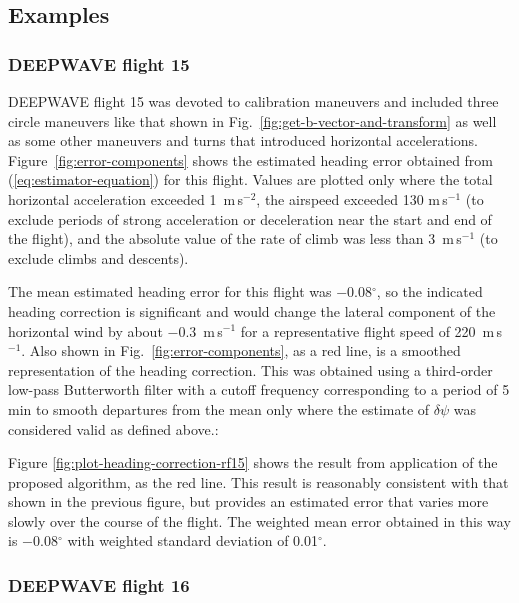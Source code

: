 \documentclass[english,british,amtd,bookmarks=false,unicode=true]{copernicus}\usepackage[]{graphicx}\usepackage[]{color}
\begin{document}
\subsection{Examples\label{sub:Examples-roll}}


\subsubsection{DEEPWAVE flight 15}

DEEPWAVE flight 15 was devoted to calibration maneuvers and included
three circle maneuvers like that shown in Fig.~\ref{fig:get-b-vector-and-transform}
as well as some other maneuvers and turns that introduced horizontal
accelerations. Figure~\ref{fig:error-components} shows the estimated
heading error obtained from (\ref{eq:estimator-equation}) for this
flight. Values are plotted only where the total horizontal acceleration
exceeded 1~m\,s$^{-2}$, the airspeed exceeded 130 m\,s$^{-1}$
(to exclude periods of strong acceleration or deceleration near the
start and end of the flight), and the absolute value of the rate of
climb was less than 3~m\,s$^{-1}$ (to exclude climbs and descents). 



The mean estimated heading error for this flight was \ensuremath{-0.08}$^{\circ}$,
so the indicated heading correction is significant and would change
the lateral component of the horizontal wind by about \ensuremath{-0.3}~m\,s$^{-1}$
for a representative flight speed of 220~m\,s$^{-1}$. Also shown
in Fig.~\ref{fig:error-components}, as a red line, is a smoothed
representation of the heading correction. This was obtained using
a third-order low-pass Butterworth filter with a cutoff frequency
corresponding to a period of 5\,min to smooth departures from the
mean only where the estimate of $\delta\psi$ was considered valid
as defined above.:



Figure \ref{fig:plot-heading-correction-rf15} shows the result from
application of the proposed algorithm, as the red line. This result
is reasonably consistent with that shown in the previous figure, but
provides an estimated error that varies more slowly over the course
of the flight. The weighted mean error obtained in this way is \ensuremath{-0.08}$^{\circ}$
with weighted standard deviation of 0.01$^{\circ}$. 


\subsubsection{DEEPWAVE flight 16}
\end{document}
